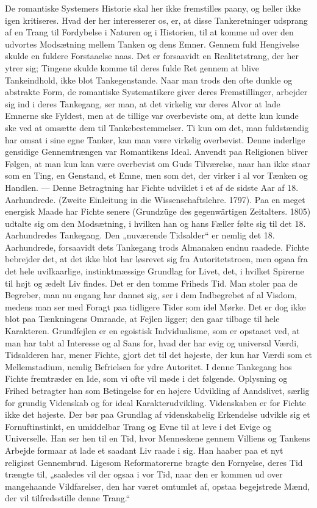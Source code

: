 \documentclass[12pt,a4paper,openany]{book}
\newcommand{\opage}[1]{\marginnote{\footnotesize\textit{[#1]}}}
\begin{document}
De romantiske Systemers Historie skal her ikke fremstilles paany,
og heller ikke igen kritiseres. Hvad der her interesserer os, er, at disse
Tankeretninger udsprang af en Trang til Fordybelse i Naturen og i
Historien, til at komme ud over den udvortes Modsætning mellem
Tanken og dens Emner. Gennem fuld Hengivelse skulde en fuldere
Forstaaelse naas. Det er forsaavidt en Realitetstrang, der her ytrer
sig; Tingene skulde komme til deres fulde Ret gennem at blive
Tankeindhold, ikke blot Tankegenstande. Naar man trods den ofte
dunkle og abstrakte Form, de romantiske Systematikere giver deres
Fremstillinger, arbejder sig ind i deres Tankegang, ser man, at det
virkelig var deres Alvor at lade Emnerne ske Fyldest, men at de
tillige var overbeviste om, at dette kun kunde ske ved at omsætte
dem til Tankebestemmelser. Ti kun om det, man fuldstændig har
omsat i sine egne Tanker, kan man være virkelig overbevist. Denne
inderlige gensidige Gennemtrængen var Romantikens Ideal. Anvendt
paa Religionen bliver Følgen, at man kun kan være overbevist om
Guds Tilværelse, naar han ikke staar som en Ting, en Genstand,
et Emne, men som det, der virker i al vor Tænken og Handlen.
--- Denne Betragtning har Fichte udviklet i et af de sidste Aar
af 18. Aarhundrede. (Zweite Einleitung in die Wissenschaftslehre.
1797). Paa en meget energisk Maade har Fichte senere (Grundzüge des
\opage{8}gegenwärtigen Zeitalters. 1805) udtalte sig om den Modsætning, i hvilken
han og hans Fæller følte sig til det 18. Aarhundredes Tankegang.
Den „nuværende Tidsalder“ er nemlig det 18. Aarhundrede, forsaavidt
dets Tankegang trods Almanaken endnu raadede. Fichte bebrejder
det, at det ikke blot har løsrevet sig fra Autoritetstroen, men ogsaa
fra det hele uvilkaarlige, instinktmæssige Grundlag for Livet, det, i
hvilket Spirerne til højt og ædelt Liv findes. Det er den tomme Friheds
Tid. Man stoler paa de Begreber, man nu engang har dannet
sig, ser i dem Indbegrebet af al Visdom, medens man ser med Foragt
paa tidligere Tider som idel Mørke. Det er dog ikke blot paa Tænkningens
Omraade, at Fejlen ligger; den gaar tilbage til hele Karakteren.
Grundfejlen er en egoistisk Indvidualisme, som er opstaaet ved,
at man har tabt al Interesse og al Sans for, hvad der har evig og universal
Værdi, Tidsalderen har, mener Fichte, gjort det til det højeste,
der kun har Værdi som et Mellemstadium, nemlig Befrielsen for
ydre Autoritet.
I denne Tankegang hos Fichte fremtræder en Ide, som vi ofte vil
møde i det følgende. Oplysning og Frihed betragter han som Betingelse
for en højere Udvikling af Aandslivet, særlig for grundig Videnskab
og for ideal Karakterudvikling. Videnskaben er for Fichte
ikke det højeste. Der bør paa Grundlag af videnskabelig Erkendelse
udvikle sig et Fornuftinstinkt, en umiddelbar Trang og Evne til at
leve i det Evige og Universelle. Han ser hen til en Tid, hvor Menneskene
gennem Villiens og Tankens Arbejde formaar at lade et saadant
Liv raade i sig. Han haaber paa et nyt religiøst Gennembrud.
Ligesom Reformatorerne bragte den Fornyelse, deres Tid trængte til,
„saaledes vil der ogsaa i vor Tid, naar den er kommen ud over
mangehaande Vildfarelser, den har været omtumlet af, opstaa begejstrede
Mænd, der vil tilfredsstille denne Trang.“
\end{document}
